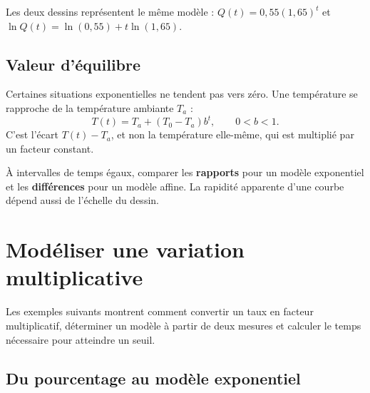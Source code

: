 \begin{center}
\qquad
{}
\end{center}

Les deux dessins représentent le même modèle : $Q(t)=0{,}55(1{,}65)^t$ et $\ln Q(t)=\ln(0{,}55)+t\ln(1{,}65)$.

\subsection{Valeur d'équilibre}
Certaines situations exponentielles ne tendent pas vers zéro. Une température se rapproche de la température ambiante $T_a$ :
\[
T(t)=T_a+(T_0-T_a)b^t,
\qquad 0<b<1.
\]
C'est l'écart $T(t)-T_a$, et non la température elle-même, qui est multiplié par un facteur constant.

\begin{connectionbox}
À intervalles de temps égaux, comparer les \textbf{rapports} pour un modèle exponentiel et les \textbf{différences} pour un modèle affine. La rapidité apparente d'une courbe dépend aussi de l'échelle du dessin.
\end{connectionbox}


\section{Modéliser une variation multiplicative}
\label{manual:section:06.08}

Les exemples suivants montrent comment convertir un taux en facteur multiplicatif, déterminer un modèle à partir de deux mesures et calculer le temps nécessaire pour atteindre un seuil.

\subsection{Du pourcentage au modèle exponentiel}

